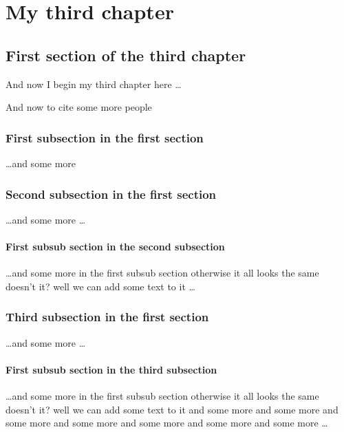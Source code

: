 \chapter{My third chapter}
\label{ch:my-third-chapter}

\ifpdf
    \graphicspath{{Chapter3/Figs/Raster/}{Chapter3/Figs/PDF/}{Chapter3/Figs/}}
\else
    \graphicspath{{Chapter3/Figs/Vector/}{Chapter3/Figs/}}
\fi

\section{First section of the third chapter}
And now I begin my third chapter here \dots

And now to cite some more people~\citet{Rea85,Ancey1996}

\subsection{First subsection in the first section}
\dots and some more 

\subsection{Second subsection in the first section}
\dots and some more \dots

\subsubsection{First subsub section in the second subsection}
\dots and some more in the first subsub section otherwise it all looks the same
doesn't it? well we can add some text to it \dots

\subsection{Third subsection in the first section}
\dots and some more \dots

\subsubsection{First subsub section in the third subsection}
\dots and some more in the first subsub section otherwise it all looks the same
doesn't it? well we can add some text to it and some more and some more and
some more and some more and some more and some more and some more \dots

